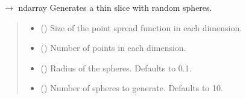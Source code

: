 \documentclass[letterpaper,10pt,english]{sphinxmanual}
\begin{document}
\begin{fulllineitems}
\label{\detokenize{source/ShapesGenerator:ShapesGenerator.generate_sphere_slices}}
\pysigstartsignatures
\pysiglinewithargsret
{}
{\sphinxparamcomma {}\sphinxparamcomma {}\sphinxparamcomma {}\sphinxparamcomma {}}
{{ $\rightarrow$ ndarray}}
\pysigstopsignatures
\sphinxAtStartPar
Generates a thin slice with random spheres.
\begin{quote}\begin{description}
\begin{itemize}
\item {} 
\sphinxAtStartPar
{} (\sphinxstyleliteralemphasis{\sphinxupquote{{[}}}\sphinxstyleliteralemphasis{\sphinxupquote{, }}\sphinxstyleliteralemphasis{\sphinxupquote{, }}\sphinxstyleliteralemphasis{\sphinxupquote{{]}}}) \textendash{} Size of the point spread function in each dimension.

\item {} 
\sphinxAtStartPar
{} () \textendash{} Number of points in each dimension.

\item {} 
\sphinxAtStartPar
{} (\sphinxstyleliteralemphasis{\sphinxupquote{, }}) \textendash{} Radius of the spheres. Defaults to 0.1.

\item {} 
\sphinxAtStartPar
{} (\sphinxstyleliteralemphasis{\sphinxupquote{, }}) \textendash{} Number of spheres to generate. Defaults to 10.


\end{itemize}
\end{description}
\end{quote}
\end{fulllineitems}
\end{document}
